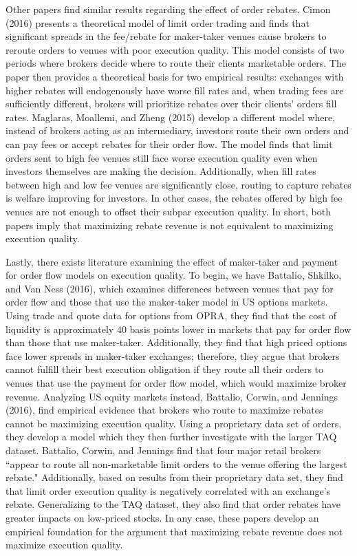\documentclass[12pt,a4paper]{article}
\begin{document}
Other papers find similar results regarding the effect of order rebates. Cimon (2016) presents a theoretical model of limit order trading and finds that significant spreads in the fee/rebate for maker-taker venues cause brokers to reroute orders to venues with poor execution quality. This model consists of two periods where brokers decide where to route their clients marketable orders. The paper then provides a theoretical basis for two empirical results: exchanges with higher rebates will endogenously have worse fill rates and, when trading fees are sufficiently different, brokers will prioritize rebates over their clients' orders fill rates. Maglaras, Moallemi, and Zheng (2015) develop a different model where, instead of brokers acting as an intermediary, investors route their own orders and can pay fees or accept rebates for their order flow. The model finds that limit orders sent to high fee venues still face worse execution quality even when investors themselves are making the decision. Additionally, when fill rates between high and low fee venues are significantly close, routing to capture rebates is welfare improving for investors. In other cases, the rebates offered by high fee venues are not enough to offset their subpar execution quality. In short, both papers imply that maximizing rebate revenue is not equivalent to maximizing execution quality. 

Lastly, there exists literature examining the effect of maker-taker and payment for order flow models on execution quality. To begin, we have Battalio, Shkilko, and Van Ness (2016), which examines differences between venues that pay for order flow and those that use the maker-taker model in US options markets. Using trade and quote data for options from OPRA, they find that the cost of liquidity is approximately 40 basis points lower in markets that pay for order flow than those that use maker-taker. Additionally, they find that high priced options face lower spreads in maker-taker exchanges; therefore, they argue that brokers cannot fulfill their best execution obligation if they route all their orders to venues that use the payment for order flow model, which would maximize broker revenue. Analyzing US equity markets instead, Battalio, Corwin, and Jennings (2016), find empirical evidence that brokers who route to maximize rebates cannot be maximizing execution quality. Using a proprietary data set of orders, they develop a model which they then further investigate with the larger TAQ dataset. Battalio, Corwin, and Jennings find that four major retail brokers ``appear to route all non-marketable limit orders to the venue offering the largest rebate." Additionally, based on results from their proprietary data set, they find that limit order execution quality is negatively correlated with an exchange's rebate. Generalizing to the TAQ dataset, they also find that order rebates have greater impacts on low-priced stocks. In any case, these papers develop an empirical foundation for the argument that maximizing rebate revenue does not maximize execution quality. 
\end{document}
